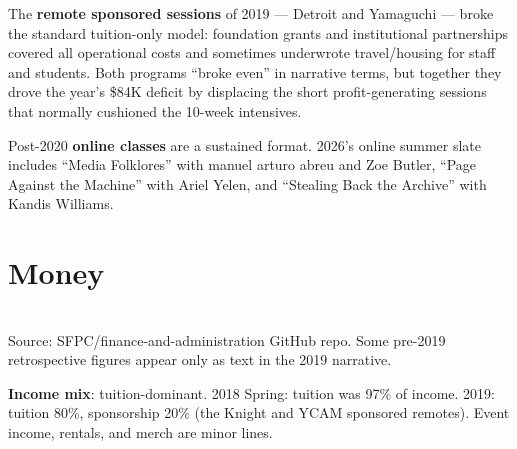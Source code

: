 \documentclass[10pt,letterpaper,twocolumn]{article}
\begin{document}
The \textbf{remote sponsored sessions} of 2019 --- Detroit and Yamaguchi --- broke the standard tuition-only model: foundation grants and institutional partnerships covered all operational costs and sometimes underwrote travel/housing for staff and students. Both programs ``broke even'' in narrative terms, but together they drove the year's \$84K deficit by displacing the short profit-generating sessions that normally cushioned the 10-week intensives.

Post-2020 \textbf{online classes} are a sustained format. 2026's online summer slate includes ``Media Folklores'' with manuel arturo abreu and Zoe Butler, ``Page Against the Machine'' with Ariel Yelen, and ``Stealing Back the Archive'' with Kandis Williams.

\section{Money}

\begin{table}[h]
\small
\centering
\\[0.3em]
\footnotesize Source: SFPC/finance-and-administration GitHub repo. Some pre-2019 retrospective figures appear only as text in the 2019 narrative.
\end{table}

\textbf{Income mix}: tuition-dominant. 2018 Spring: tuition was 97\% of income. 2019: tuition 80\%, sponsorship 20\% (the Knight and YCAM sponsored remotes). Event income, rentals, and merch are minor lines.
\end{document}
